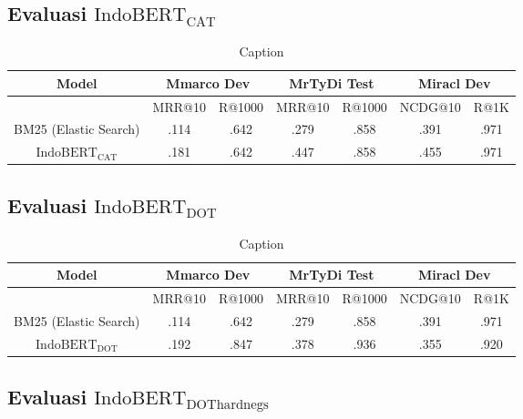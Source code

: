\subsection{Evaluasi $\text{IndoBERT}_{\text{CAT}}$}
\label{sec:resultindobertcat}

\begin{table}
    \centering
    \caption{Caption}
    \label{tab:indobertcat}
    \begin{tabular}{|c|cc|cc|cc|} \hline 
         Model&  \multicolumn{2}{|c|}{Mmarco Dev}& 
         \multicolumn{2}{|c|}{MrTyDi Test}&  \multicolumn{2}{|c|}{Miracl Dev}\\ \hline 
            & MRR@10 & R@1000 & MRR@10 & R@1000 & NCDG@10 & R@1K\\ \hline 
            BM25 (Elastic Search) & .114 & .642 & .279 & .858 & .391 & .971\\ \hline
            $\text{IndoBERT}_{\text{CAT}}$ & .181 & .642 & .447 & .858 & .455 & .971\\ \hline
            
    \end{tabular}
    
    \label{tab:my_label}
\end{table}


\subsection{Evaluasi $\text{IndoBERT}_{\text{DOT}}$}
\label{sec:resultindobertdot}

\begin{table}
    \centering
    \caption{Caption}
    \label{tab:indobertdot}
    \begin{tabular}{|c|cc|cc|cc|} \hline 
         Model&  \multicolumn{2}{|c|}{Mmarco Dev}& 
         \multicolumn{2}{|c|}{MrTyDi Test}&  \multicolumn{2}{|c|}{Miracl Dev}\\ \hline 
            & MRR@10 & R@1000 & MRR@10 & R@1000 & NCDG@10 & R@1K\\ \hline 
            BM25 (Elastic Search) & .114 & .642 & .279 & .858 & .391 & .971\\ \hline
            $\text{IndoBERT}_{\text{DOT}}$ & .192 & .847 & .378 & .936 & .355 & .920\\ \hline
    \end{tabular}
    
\end{table}

\subsection{Evaluasi $\text{IndoBERT}_{\text{DOThardnegs}}$}
\label{sec:resultindobertdothardnegs}

